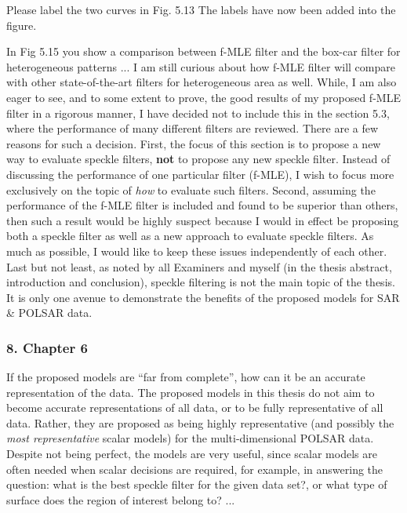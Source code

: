 \replyToComment
    {Please label the two curves in Fig. 5.13}
    {The labels have now been added into the figure.}    

\replyToComment
    {
      In Fig 5.15 you show a comparison between f-MLE filter and the box-car filter for heterogeneous patterns ...
      I am still curious about how f-MLE filter will compare with other state-of-the-art filters for heterogeneous area as well.
    }
    {
While, I am also eager to see, and to some extent to prove, the good results of my proposed f-MLE filter in a rigorous manner,
  I have decided not to include this in the section 5.3, where the performance of many different filters are reviewed.
There are a few reasons for such a decision.
First, the focus of this section is to propose a new way to evaluate speckle filters, \textbf{not} to propose any new speckle filter.
Instead of discussing the performance of one particular filter (f-MLE), I wish to focus more exclusively on the topic of \textit{how} to evaluate such filters.
Second, assuming the performance of the f-MLE filter is included and found to be superior than others,
  then such a result would be highly suspect
because I would in effect be proposing both a speckle filter as well as a new approach to evaluate speckle filters.
As much as possible, I would like to keep these issues independently of each other.
Last but not least, as noted by all Examiners and myself (in the thesis abstract, introduction and conclusion), speckle filtering is not the main topic of the thesis.
It is only one avenue to demonstrate the benefits of the proposed models for SAR \& POLSAR data.
    }

    
\subsubsection*{8. Chapter 6}

\replyToComment
    {If the proposed models are ``far from complete'', how can it be an accurate representation of the data.}
    {The proposed models in this thesis do not aim to become accurate representations of all data, or to be fully representative of all data.
Rather, they are proposed as being highly representative (and possibly the \textit{most representative} scalar models) for the multi-dimensional POLSAR data.
Despite not being perfect, the models are very useful, since scalar models are often needed when scalar decisions are required,
  for example, in answering the question: what is the best speckle filter for the given data set?, or what type of surface does the region of interest belong to? ...
}

